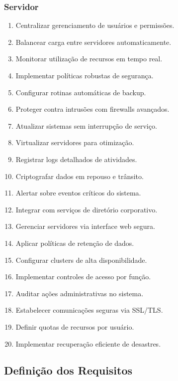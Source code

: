 \subsubsection{Servidor}
\begin{enumerate}
 \item Centralizar gerenciamento de usuários e permissões.
 \item Balancear carga entre servidores automaticamente.
 \item Monitorar utilização de recursos em tempo real.
 \item Implementar políticas robustas de segurança.
 \item Configurar rotinas automáticas de backup.
 \item Proteger contra intrusões com firewalls avançados.
 \item Atualizar sistemas sem interrupção de serviço.
 \item Virtualizar servidores para otimização.
 \item Registrar logs detalhados de atividades.
 \item Criptografar dados em repouso e trânsito.
 \item Alertar sobre eventos críticos do sistema.
 \item Integrar com serviços de diretório corporativo.
 \item Gerenciar servidores via interface web segura.
 \item Aplicar políticas de retenção de dados.
 \item Configurar clusters de alta disponibilidade.
 \item Implementar controles de acesso por função.
 \item Auditar ações administrativas no sistema.
 \item Estabelecer comunicações seguras via SSL/TLS.
 \item Definir quotas de recursos por usuário.
 \item Implementar recuperação eficiente de desastres.
\end{enumerate}

\subsection{Definição dos Requisitos}

